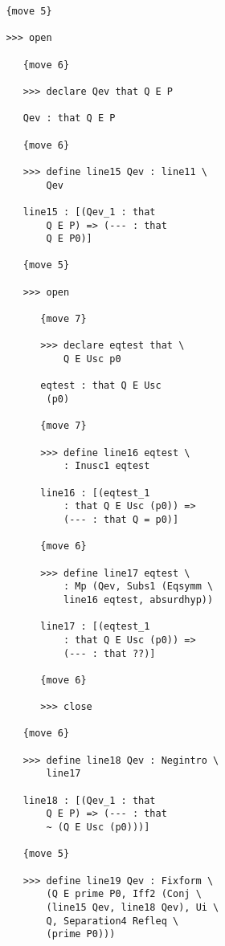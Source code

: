 \documentclass[12pt]{article}
\begin{document}
\begin{verbatim}
               {move 5}

               >>> open

                  {move 6}

                  >>> declare Qev that Q E P

                  Qev : that Q E P

                  {move 6}

                  >>> define line15 Qev : line11 \
                      Qev

                  line15 : [(Qev_1 : that 
                      Q E P) => (--- : that 
                      Q E P0)]

                  {move 5}

                  >>> open

                     {move 7}

                     >>> declare eqtest that \
                         Q E Usc p0

                     eqtest : that Q E Usc 
                      (p0)

                     {move 7}

                     >>> define line16 eqtest \
                         : Inusc1 eqtest

                     line16 : [(eqtest_1 
                         : that Q E Usc (p0)) => 
                         (--- : that Q = p0)]

                     {move 6}

                     >>> define line17 eqtest \
                         : Mp (Qev, Subs1 (Eqsymm \
                         line16 eqtest, absurdhyp))

                     line17 : [(eqtest_1 
                         : that Q E Usc (p0)) => 
                         (--- : that ??)]

                     {move 6}

                     >>> close

                  {move 6}

                  >>> define line18 Qev : Negintro \
                      line17

                  line18 : [(Qev_1 : that 
                      Q E P) => (--- : that 
                      ~ (Q E Usc (p0)))]

                  {move 5}

                  >>> define line19 Qev : Fixform \
                      (Q E prime P0, Iff2 (Conj \
                      (line15 Qev, line18 Qev), Ui \
                      Q, Separation4 Refleq \
                      (prime P0)))


\end{verbatim}
\end{document}
